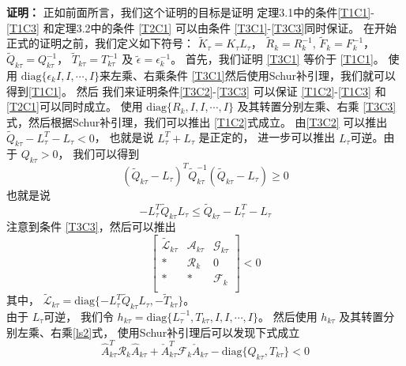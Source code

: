 	{\bf 证明：} 
	正如前面所言，我们这个证明的目标是证明 定理3.1中的条件\eqref{T1C1}-\eqref{T1C3} 和定理3.2中的条件 \eqref{T2C1} 可以由条件 \eqref{T3C1}-\eqref{T3C3}同时保证。 在开始正式的证明之前，我们定义如下符号： $\tilde{K}_{\tau }=K_{\tau }L_{\tau }$， $\tilde{R}_{k}=R^{-1}_{k}$, $\tilde{F}_{k}=F^{-1}_{k}$， $\tilde{Q}_{k\tau }=Q^{-1}_{k\tau }$， $\tilde{T}_{k\tau }=T^{-1}_{k\tau }$ 及 $\tilde{\epsilon}=\epsilon^{-1}_{k}$。
	首先，我们证明 \eqref{T3C1} 等价于 \eqref{T1C1}。 使用 $\mathrm{diag}\{\epsilon_{k}I,I,\cdots,I \}$来左乘、右乘条件 \eqref{T3C1}然后使用Schur补引理，我们就可以得到\eqref{T1C1}。
	然后 我们来证明条件\eqref{T3C2}-\eqref{T3C3} 可以保证 \eqref{T1C2}-\eqref{T1C3} 和 \eqref{T2C1}可以同时成立。  使用 $\mathrm{diag}\{R_{k}, I ,I,\cdots, I \}$  及其转置分别左乘、右乘 \eqref{T3C3}式，然后根据Schur补引理，我们可以推出 \eqref{T1C2}式成立。
	由\eqref{T3C2} 可以推出$ \tilde{Q}_{k\tau}-L^{T}_{\tau }-L_{\tau }<0$， 也就是说 $L^{T}_{\tau }+L_{\tau } $ 是正定的， 进一步可以推出 $L_{\tau }$可逆。由于 $Q_{k\tau}>0$， 我们可以得到
	\begin{equation}
	(\tilde{Q}_{k\tau} - L_{\tau } )^{T}\tilde{Q}^{-1}_{k\tau }(\tilde{Q}_{k\tau} - L_{\tau } )\geq 0
	\end{equation}
	也就是说
	\begin{equation}
	-L^{T}_{\tau }\tilde{Q}_{k\tau }L_{\tau } \leq  \tilde{Q}_{k\tau}-L^{T}_{\tau }-L_{\tau }
	\end{equation}
	注意到条件 \eqref{T3C3}，然后可以推出
	\begin{equation} \label{ls2}
	\begin{bmatrix}
	\tilde{\mathscr{L}}_{k\tau }&\mathscr{A}_{k\tau }&\mathscr{G}_{k\tau }\\
	*&\mathscr{R}_{k}&0\\
	*&*&\mathscr{F}_{k}\\
	\end{bmatrix}<0
	\end{equation}
	其中， $\tilde{\mathscr{L}}_{k\tau }= \mathrm{diag}\{-L^{T}_{\tau }\tilde{Q}_{k\tau }L_{\tau },  -\tilde{T}_{k\tau } \}$。 \\
	由于 $L_{\tau }$可逆， 我们令 $h_{k\tau }= \mathrm{diag}\{L^{-1}_{\tau }, T_{k\tau }, I, I,\cdots, I \}$。 然后使用 $h_{k\tau }$ 及其转置分别左乘、右乘\eqref{ls2}式， 使用Schur补引理后可以发现下式成立
	\begin{equation} \label{ls3}
	\hat{A}^{T}_{k\tau }\mathcal{R}_{k}\hat{A}_{k\tau } + \check{A}^{T}_{k\tau }\mathcal{F}_{k}\check{A}_{k\tau }  - \mathrm{diag}\{Q_{k\tau }, T_{k\tau }\} < 0  
	\end{equation}

